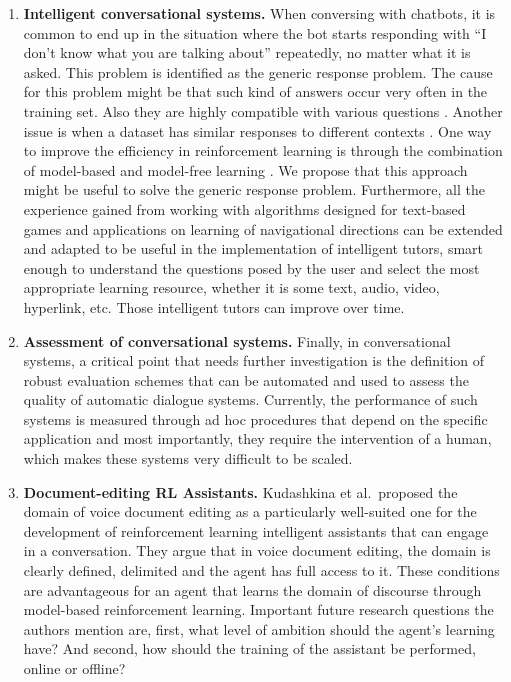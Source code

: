 \begin{enumerate}
Other possible desired state properties could be to maximize a human's  excitement in order to motivate him to make a decision; to maximize  the duration of the conversation, or lead it to an early end with a  pleased human; to acquire certain information from, or to pass on  information to the human. However, not all goals can be easily  expressed as points in a continuous utterance space that represents a  dialogue. To this end, future research on language needs to be  extended towards representing more of its semantics, which entails  understanding the entire situation.
\item {\bf Intelligent conversational systems.}
When conversing with chatbots, it is common to end up in the situation where the bot starts responding with “I don’t know what you are talking about” repeatedly, no matter what it is asked. This problem is identified as the generic response problem. The cause for this problem might be that such kind of answers occur very often in the training set. Also they are highly compatible with various questions . Another issue is when a dataset has similar responses to different contexts . One way to improve the efficiency in reinforcement learning is through the combination of model-based and model-free learning . We propose that this approach might be useful to solve the generic response problem.
Furthermore, all the experience gained from working with algorithms designed for text-based games and applications on learning of navigational directions can be extended and adapted to be useful in the implementation of intelligent tutors, smart enough to understand the questions posed by the user and select the most appropriate learning resource, whether it is some text, audio, video, hyperlink, etc. Those intelligent tutors can improve over time.
\item {\bf Assessment of conversational systems.}
Finally, in conversational  systems, a critical point that needs further investigation is the definition of robust evaluation schemes that can be automated and used to assess the quality of automatic dialogue systems. Currently, the performance of such systems is measured through ad hoc procedures that depend on the specific application and most importantly, they require the intervention of a human, which makes these systems very difficult to be scaled.
\item {\bf Document-editing RL Assistants.}
Kudashkina et al.\  proposed the domain of voice document editing as a particularly well-suited one for the development of reinforcement learning intelligent assistants that can engage in a conversation. They argue that in voice document editing, the domain is clearly defined, delimited and the agent has full access to it. These conditions are advantageous for an agent that learns the domain of discourse through model-based reinforcement learning. Important future research questions the authors mention are, first, what level of ambition should the agent's learning have? And second, how should the training of the assistant be performed, online or offline?
\end{enumerate}

